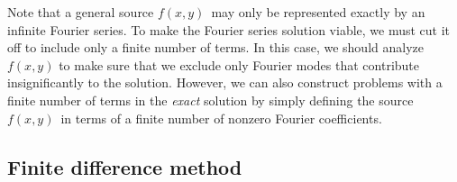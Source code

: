 Note that a general source $f(x,y)$ may only be represented exactly by an infinite Fourier series.
To make the Fourier series solution viable, we must cut it off to include only a finite number of terms.
In this case, we should analyze $f(x,y)$ to make sure that we exclude only Fourier modes that contribute insignificantly to the solution.
However, we can also construct problems with a finite number of terms in the \emph{exact} solution by simply defining the source $f(x,y)$ in terms of a finite number of nonzero Fourier coefficients.


\subsection{Finite difference method}
\label{sec:pde:numerical_solution}

\newcommand{\crossStencilInternal}[5]{
    \draw (0,-1) node{$#1$} -- (0,+1) node{$#2$};
    \draw (-1,0) node{$#3$} -- (+1,0) node{$#4$};
	\draw (0,0)  node{$#5$};
}
\newcommand{\xStencilInternal}[4]{
    \draw (-1,-1) node{$#1$} -- (+1,+1) node{$#2$};
    \draw (-1,+1) node{$#3$} -- (+1,-1) node{$#4$};
}
\newcommand{\crossStencil}[5]{%
  \begin{tikzpicture}[scale=1.0,baseline={([yshift=-0.5ex]current bounding box.center)}, every node/.style={scale=1.0,inner sep=0pt, minimum size=5.5ex, fill=white}, nodes={draw, circle}]
    \crossStencilInternal{#1}{#2}{#3}{#4}{#5}
  \end{tikzpicture}
}
\newcommand{\xStencil}[4]{%
  \begin{tikzpicture}[scale=1.0,baseline={([yshift=-0.5ex]current bounding box.center)}, every node/.style={scale=1.0,inner sep=0pt, minimum size=5.5ex, fill=white}, nodes={draw, circle}]
    \xStencilInternal{#1}{#2}{#3}{#4}
  \end{tikzpicture}
}
\newcommand{\boxStencil}[9]{
  \begin{tikzpicture}[scale=1.0,baseline={([yshift=-0.5ex]current bounding box.center)}, every node/.style={scale=1.0,inner sep=0pt, minimum size=5.5ex, fill=white}, nodes={draw, circle}]
	\xStencilInternal{#6}{#7}{#8}{#9};
	\crossStencilInternal{#1}{#2}{#3}{#4}{#5};
  \end{tikzpicture}
}

